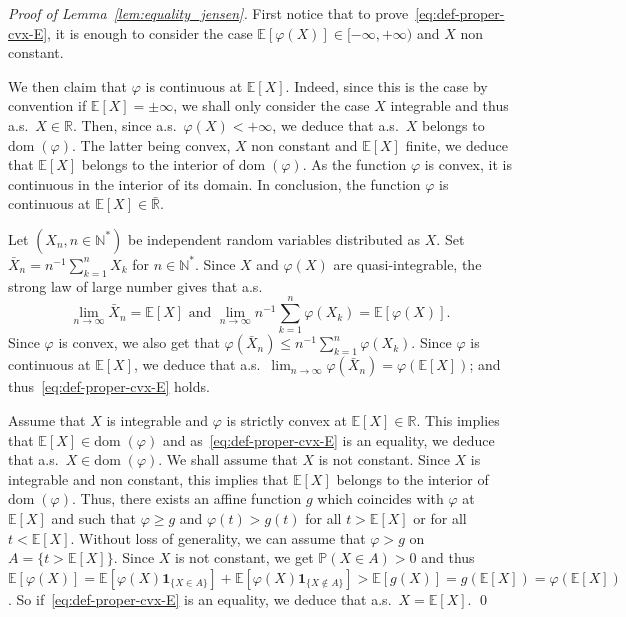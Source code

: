 \documentclass[10pt,a4paper]{amsart}
\newcommand{\E}{{\mathbb E}}
\newcommand{\N}{{\mathbb N}}
\newcommand{\R}{{\mathbb R}}
\newcommand{\dom}{{\mathrm{dom}}\;}
\newcommand{\ind}{\mathbf{1}}
\renewcommand{\P}{{\mathbb P}}
\begin{document}
\begin{proof}[Proof of Lemma~\ref{lem:equality_jensen}]
  First notice that to prove~\eqref{eq:def-proper-cvx-E}, it is
  enough to  consider the case  $\E[\varphi(X)]\in [-\infty , + \infty )$
  and   $X$   non  constant.


  We then claim  that $\varphi$ is continuous  at $\E[X]$.  Indeed,
  since this is  the case by convention if $\E[X]=\pm\infty  $, we shall
  only consider the case $X$ integrable  and thus a.s.\ $X\in \R$. Then,
  since a.s.\ $\varphi(X)<+\infty $, we deduce that a.s.\ $X$ belongs to
  $\dom(\varphi)$. The latter being convex, $X$ non constant and $\E[X]$
  finite,  we   deduce  that   $\E[X]$  belongs   to  the   interior  of
  $\dom(\varphi)$. As the function $\varphi$ is convex, it is continuous
  in  the interior  of  its  domain. In conclusion,  the  function $\varphi$  is
  continuous at $\E[X]\in \bar \R$.

 Let $(X_n, n\in \N^*)$ be independent random
  variables distributed as $X$. Set $\bar X_n=n^{-1} \sum_{k=1}^n X_k$
  for $n\in \N^*$.
  Since $X$ and $\varphi(X)$ are quasi-integrable, the
  strong law of large number gives that a.s.\ 
  $$
  \lim_{n\rightarrow \infty
  } \bar X_n= \E[X] \text{ and }\lim_{n\rightarrow \infty
  } n^{-1} \sum_{k=1}^n \varphi(X_k)= \E[\varphi(X)].
  $$
Since $\varphi$ is convex, we also get that $\varphi(\bar X_n) \leq
n^{-1} \sum_{k=1}^n \varphi(X_k)$. Since $\varphi$ is continuous at
$\E[X]$,
we deduce that a.s.\ $\lim_{n\rightarrow \infty
} \varphi(\bar X_n) = \varphi(\E[X])$;
and thus~\eqref{eq:def-proper-cvx-E}
holds.


Assume  that $X$  is  integrable  and $\varphi$  is  strictly convex  at
$\E[X]\in \R$.  This implies that
$\E[X]\in \dom (\varphi)$  and as~\eqref{eq:def-proper-cvx-E} is an
equality, we deduce that a.s.\ $X \in \dom  (\varphi)$.  We shall
assume  that $X$  is  not  constant. Since  $X$  is  integrable and  non
constant,  this  implies  that  $\E[X]$   belongs  to  the  interior  of
$\dom ( \varphi)$.   Thus,  there  exists an  affine  function  $g$  which
coincides with $\varphi$  at $\E[X]$ and such that $\varphi  \geq g$ and
$\varphi(t)>g(t)$ for all $t>\E[X]$ or  for all $t<\E[X]$.  Without loss
of  generality, we  can  assume that  $\varphi>g$  on $A=\{t>  \E[X]\}$.
Since   $X$  is   not  constant,   we  get   $\P(X\in  A)>0$   and  thus
$\E[\varphi(X)]=        \E[\varphi(X)\ind_{\{X\in         A\}}]        +
\E[\varphi(X)\ind_{\{X\not \in A\}}]> \E[g(X)]=g(\E[X])=\varphi(\E[X])$.
So if~\eqref{eq:def-proper-cvx-E}  is an equality, we  deduce that a.s.\
$X=\E[X]$. \hfill \qed
\end{proof}
\end{document}
